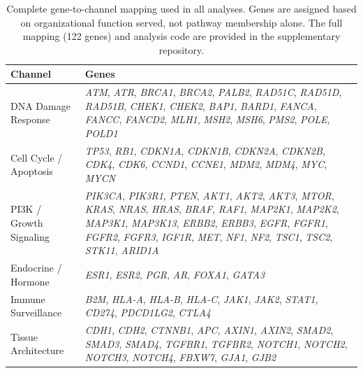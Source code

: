 \documentclass[11pt]{article}
\begin{document}
\begin{landscape}
\begin{table}[p]
\centering
\caption{Complete gene-to-channel mapping used in all analyses.
Genes are assigned based on organizational function served, not
pathway membership alone. The full mapping (122 genes) and analysis
code are provided in the supplementary repository.}
\label{tab:gene-mapping}
\begin{tabular}{@{}>{\raggedright}p{4.5cm}>{\raggedright\arraybackslash}p{18cm}@{}}
\toprule
\textbf{Channel} & \textbf{Genes} \\
\midrule
DNA Damage Response &
  \emph{ATM}, \emph{ATR}, \emph{BRCA1}, \emph{BRCA2}, \emph{PALB2},
  \emph{RAD51C}, \emph{RAD51D}, \emph{RAD51B}, \emph{CHEK1},
  \emph{CHEK2}, \emph{BAP1}, \emph{BARD1}, \emph{FANCA},
  \emph{FANCC}, \emph{FANCD2}, \emph{MLH1}, \emph{MSH2},
  \emph{MSH6}, \emph{PMS2}, \emph{POLE}, \emph{POLD1} \\[6pt]
Cell Cycle / Apoptosis &
  \emph{TP53}, \emph{RB1}, \emph{CDKN1A}, \emph{CDKN1B},
  \emph{CDKN2A}, \emph{CDKN2B}, \emph{CDK4}, \emph{CDK6},
  \emph{CCND1}, \emph{CCNE1}, \emph{MDM2}, \emph{MDM4},
  \emph{MYC}, \emph{MYCN} \\[6pt]
PI3K / Growth Signaling &
  \emph{PIK3CA}, \emph{PIK3R1}, \emph{PTEN}, \emph{AKT1},
  \emph{AKT2}, \emph{AKT3}, \emph{MTOR}, \emph{KRAS}, \emph{NRAS},
  \emph{HRAS}, \emph{BRAF}, \emph{RAF1}, \emph{MAP2K1},
  \emph{MAP2K2}, \emph{MAP3K1}, \emph{MAP3K13}, \emph{ERBB2},
  \emph{ERBB3}, \emph{EGFR}, \emph{FGFR1}, \emph{FGFR2},
  \emph{FGFR3}, \emph{IGF1R}, \emph{MET}, \emph{NF1}, \emph{NF2},
  \emph{TSC1}, \emph{TSC2}, \emph{STK11}, \emph{ARID1A} \\[6pt]
Endocrine / Hormone &
  \emph{ESR1}, \emph{ESR2}, \emph{PGR}, \emph{AR}, \emph{FOXA1},
  \emph{GATA3} \\[6pt]
Immune Surveillance &
  \emph{B2M}, \emph{HLA-A}, \emph{HLA-B}, \emph{HLA-C},
  \emph{JAK1}, \emph{JAK2}, \emph{STAT1}, \emph{CD274},
  \emph{PDCD1LG2}, \emph{CTLA4} \\[6pt]
Tissue Architecture &
  \emph{CDH1}, \emph{CDH2}, \emph{CTNNB1}, \emph{APC},
  \emph{AXIN1}, \emph{AXIN2}, \emph{SMAD2}, \emph{SMAD3},
  \emph{SMAD4}, \emph{TGFBR1}, \emph{TGFBR2}, \emph{NOTCH1},
  \emph{NOTCH2}, \emph{NOTCH3}, \emph{NOTCH4}, \emph{FBXW7},
  \emph{GJA1}, \emph{GJB2} \\
\bottomrule
\end{tabular}
\end{table}

\end{landscape}
\end{document}
